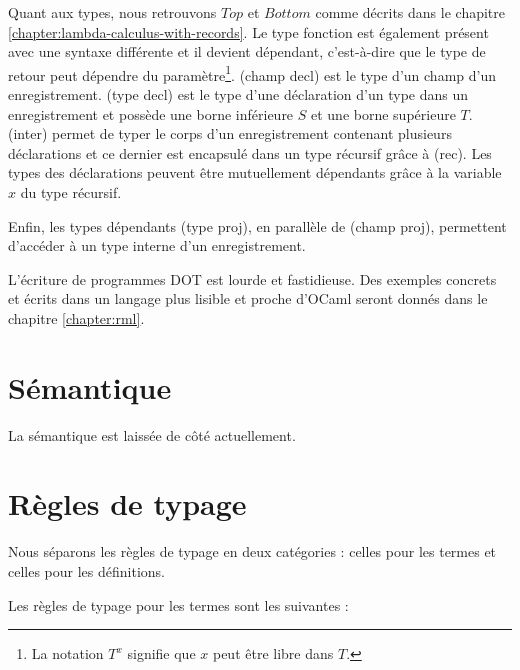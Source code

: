 Quant aux types, nous retrouvons $Top$ et $Bottom$ comme décrits dans le
chapitre \ref{chapter:lambda-calculus-with-records}. Le type fonction est
également présent avec une syntaxe différente et il devient dépendant,
c'est-à-dire que le type de retour peut dépendre du paramètre\footnote{La
  notation $T^{x}$ signifie que $x$ peut être libre dans $T$.}. (champ decl) est le type d'un
champ d'un enregistrement. (type decl) est le type d'une déclaration d'un type
dans un enregistrement et possède une borne inférieure $S$ et une borne
supérieure $T$. (inter) permet de typer le corps d'un enregistrement contenant
plusieurs déclarations et ce dernier est encapsulé dans un type récursif grâce à (rec). Les
types des déclarations peuvent être mutuellement dépendants grâce à la variable
$x$ du type récursif.

Enfin, les types dépendants (type proj), en parallèle de (champ proj),
permettent d'accéder à un type interne d'un enregistrement.

L'écriture de programmes DOT est lourde et fastidieuse. Des exemples \; concrets et
écrits dans un langage plus lisible et proche d'OCaml seront donnés dans le
chapitre \ref{chapter:rml}.

\section{Sémantique}

La sémantique est laissée de côté actuellement.

\section{Règles de typage}

Nous séparons les règles de typage en deux catégories : celles pour les termes
et celles pour les définitions.

Les règles de typage pour les termes sont les suivantes :

